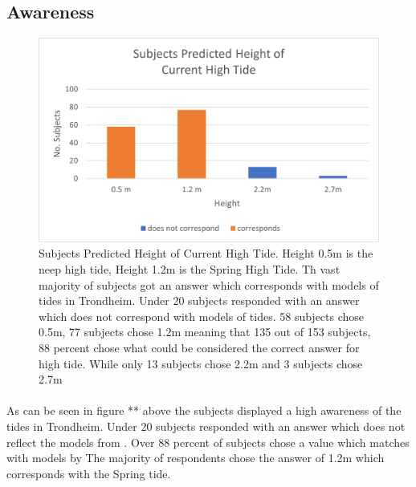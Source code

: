 \paragraph{}

\subsection{Awareness}

\begin{figure}[h]
    \centering
    \includegraphics{fig_results/2022-hightide-answers.png}
    \caption{Subjects Predicted Height of Current High Tide. Height 0.5m is the neep high tide, Height 1.2m is the Spring High Tide. Th vast majority of subjects got an answer which corresponds with models of tides in Trondheim. Under 20 subjects responded with an answer which does not correspond with models of tides. 58 subjects chose 0.5m, 77 subjects chose 1.2m meaning that 135 out of 153 subjects, 88 percent chose what could be considered the correct answer for high tide. While only 13 subjects chose 2.2m and 3 subjects chose 2.7m}
    \label{fig:high-tide-answer}
\end{figure}
\paragraph{}
As can be seen in figure ** above the subjects displayed a high awareness of the tides in Trondheim. Under 20 subjects responded with an answer which does not reflect the models from \cite{kartverket_se_2021}. Over 88 percent of subjects chose a value which matches with models by \cite{kartverket_se_2021} The majority of respondents chose the answer of 1.2m which corresponds with the Spring tide. 


